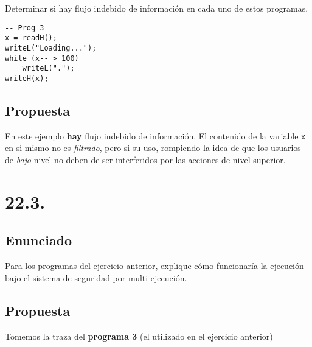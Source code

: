 \documentclass[11pt]{article}
\begin{document}
Determinar si hay flujo indebido de información en cada uno de estos programas.

\begin{lstlisting}
-- Prog 3
x = readH();
writeL("Loading...");
while (x-- > 100)
    writeL(".");
writeH(x);
\end{lstlisting}

\subsection*{Propuesta}

En este ejemplo \textbf{hay} flujo indebido de información. El contenido de la variable \texttt{x} en si mismo no es \textit{filtrado}, pero si su uso, rompiendo la idea de que los usuarios de \textit{bajo} nivel no deben de ser interferidos por las acciones de nivel superior.

\section*{22.3. }
\subsection*{Enunciado}
Para los programas del ejercicio anterior, explique cómo funcionaría la ejecución bajo el sistema de seguridad por multi-ejecución.
\subsection*{Propuesta}

Tomemos la traza del \textbf{programa 3} (el utilizado en el ejercicio anterior)
\end{document}
